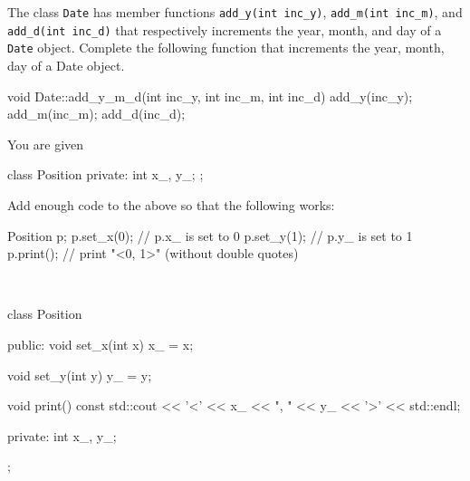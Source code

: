 

\nextq
The class \verb!Date! has member functions
\verb!add_y(int inc_y)!,
\verb!add_m(int inc_m)!, and
\verb!add_d(int inc_d)! that respectively increments the
year, month, and day of a \verb!Date! object.
Complete the following function that
increments the year, month, day of a Date object.
\\
\ANSWER
\begin{answercode}
void Date::add_y_m_d(int inc_y, int inc_m, int inc_d)
{
  add_y(inc_y);
  add_m(inc_m);
  add_d(inc_d);
}
\end{answercode}

\nextq
You are given
\begin{console}[fontsize=\footnotesize,frame=single]
class Position
{
private:
    int x_, y_;
};
\end{console}
Add enough code to the above so that the following works:
\begin{console}[fontsize=\footnotesize,frame=single]
Position p;
p.set_x(0); // p.x_ is set to 0
p.set_y(1); // p.y_ is set to 1
p.print();  // print "<0, 1>" (without double quotes)
\end{console}
\\
\ANSWER
\begin{answercode}
class Position
{
public:
void set_x(int x)
{
  x_ = x;
}

void set_y(int y)
{
  y_ = y;
}

void print() const
{
  std::cout << '<' << x_ << ", " << y_ << '>' << std::endl;
}

private:
    int x_, y_;
};
\end{answercode}

